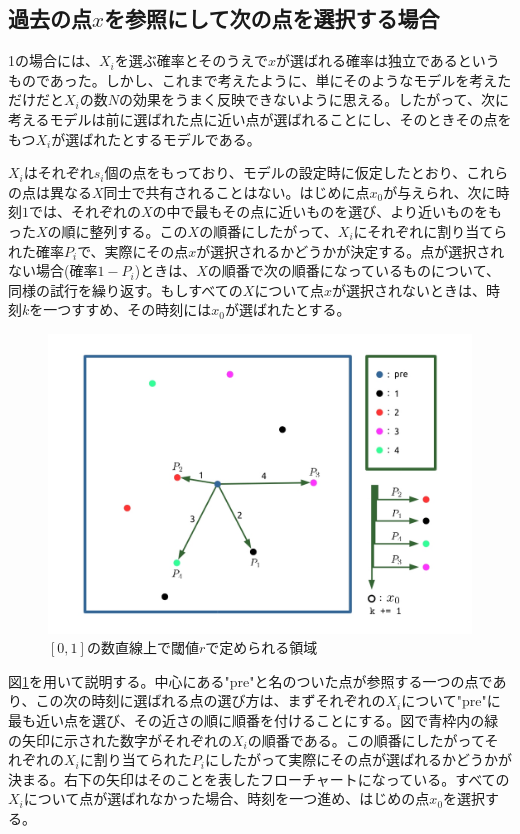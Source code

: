 \subsection{過去の点$x$を参照にして次の点を選択する場合}

1の場合には、$X_{i}$を選ぶ確率とそのうえで$x$が選ばれる確率は独立であるというものであった。しかし、これまで考えたように、単にそのようなモデルを考えただけだと$X_{i}$の数$N$の効果をうまく反映できないように思える。したがって、次に考えるモデルは前に選ばれた点に近い点が選ばれることにし、そのときその点をもつ$X_{i}$が選ばれたとするモデルである。

$X_{i}$はそれぞれ$s_{i}$個の点をもっており、モデルの設定時に仮定したとおり、これらの点は異なる$X$同士で共有されることはない。はじめに点$x_{0}$が与えられ、次に時刻$1$では、それぞれの$X$の中で最もその点に近いものを選び、より近いものをもった$X$の順に整列する。この$X$の順番にしたがって、$X_{i}$にそれぞれに割り当てられた確率$P_{i}$で、実際にその点$x$が選択されるかどうかが決定する。点が選択されない場合(確率$1-P_{i}$)ときは、$X$の順番で次の順番になっているものについて、同様の試行を繰り返す。もしすべての$X$について点$x$が選択されないときは、時刻$k$を一つすすめ、その時刻には$x_{0}$が選ばれたとする。
\begin{figure}[H]
    \begin{center}
        \includegraphics[width=12.5cm]{../img/figure2.jpg}
        \caption{$[0,1]$の数直線上で閾値$r$で定められる領域}
        \label{fig:f8}
    \end{center}
\end{figure}

図\ref{fig:f8}を用いて説明する。中心にある"pre"と名のついた点が参照する一つの点であり、この次の時刻に選ばれる点の選び方は、まずそれぞれの$X_{i}$について"pre"に最も近い点を選び、その近さの順に順番を付けることにする。図で青枠内の緑の矢印に示された数字がそれぞれの$X_{i}$の順番である。この順番にしたがってそれぞれの$X_{i}$に割り当てられた$P_{i}$にしたがって実際にその点が選ばれるかどうかが決まる。右下の矢印はそのことを表したフローチャートになっている。すべての$X_{i}$について点が選ばれなかった場合、時刻を一つ進め、はじめの点$x_{0}$を選択する。

